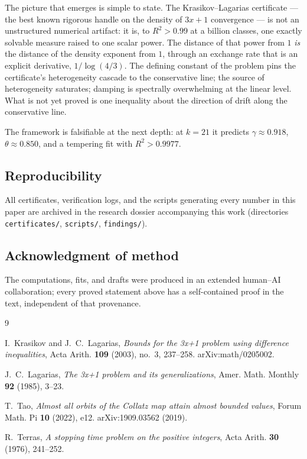 \documentclass[11pt]{article}
\theoremstyle{definition}
\theoremstyle{remark}
\newcommand{\gam}{\gamma}
\begin{document}
\medskip

The picture that emerges is simple to state. The Krasikov--Lagarias certificate
--- the best known rigorous handle on the density of $3x+1$ convergence --- is
not an unstructured numerical artifact: it is, to $R^2 > 0.99$ at a billion
classes, one exactly solvable measure raised to one scalar power. The distance
of that power from $1$ \emph{is} the distance of the density exponent from $1$,
through an exchange rate that is an explicit derivative, $1/\log(4/3)$. The
defining constant of the problem pins the certificate's heterogeneity cascade
to the conservative line; the source of heterogeneity saturates; damping is
spectrally overwhelming at the linear level. What is not yet proved is one
inequality about the direction of drift along the conservative line.

The framework is falsifiable at the next depth: at $k = 21$ it predicts
$\gam \approx 0.918$, $\theta \approx 0.850$, and a tempering fit with
$R^2 > 0.9977$.

\subsection*{Reproducibility}
All certificates, verification logs, and the scripts generating every number
in this paper are archived in the research dossier accompanying this work
(directories \texttt{certificates/}, \texttt{scripts/}, \texttt{findings/}).

\subsection*{Acknowledgment of method}
The computations, fits, and drafts were produced in an extended
human--AI collaboration; every proved statement above has a self-contained
proof in the text, independent of that provenance.

\begin{thebibliography}{9}

I.~Krasikov and J.~C.~Lagarias,
\emph{Bounds for the 3x+1 problem using difference inequalities},
Acta Arith. \textbf{109} (2003), no.~3, 237--258.
arXiv:math/0205002.

J.~C.~Lagarias,
\emph{The 3x+1 problem and its generalizations},
Amer. Math. Monthly \textbf{92} (1985), 3--23.

T.~Tao,
\emph{Almost all orbits of the Collatz map attain almost bounded values},
Forum Math. Pi \textbf{10} (2022), e12.
arXiv:1909.03562 (2019).

R.~Terras,
\emph{A stopping time problem on the positive integers},
Acta Arith. \textbf{30} (1976), 241--252.

\end{thebibliography}
\end{document}
